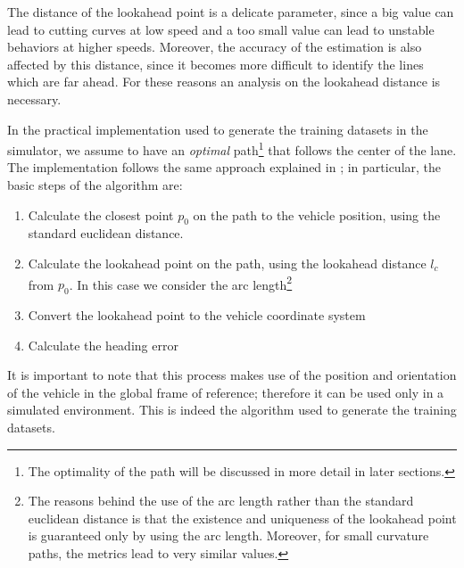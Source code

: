\documentclass[a4paper,12pt,sort&compress]{article}
\begin{document}
    The distance of the lookahead point
    is a delicate parameter, since a big value can lead to cutting curves at low
    speed and a too small value can lead to unstable behaviors at higher speeds.
    Moreover, the accuracy of the estimation is also affected by this distance,
    since it becomes more difficult to identify the lines which are far ahead.
    For these reasons an analysis on the lookahead distance is necessary. 

    In the practical implementation used to generate the training datasets in
    the simulator, we assume to have an \textit{optimal} path\footnote{The optimality of the path will be discussed in
    more detail in later sections.} that follows the center of the lane. The
    implementation follows the same approach explained in
    \citep*{coulter1992implementation}; in particular, the basic steps of the
    algorithm are:
    \begin{enumerate}
        \item Calculate the closest point $p_0$ on the path to the vehicle position,
        using the standard euclidean distance.
        \item Calculate the lookahead point on the path, using the lookahead
        distance $l_c$ from $p_0$. In this case we consider the arc
        length\footnote{The reasons behind the use of the arc length rather than
        the standard euclidean distance is that the existence and uniqueness of
        the lookahead point is guaranteed only by using the arc length.
        Moreover, for small curvature paths, the metrics lead to very similar values.}
        \item Convert the lookahead point to the vehicle coordinate system
        \item Calculate the heading error
    \end{enumerate}
    It is important to note that this process makes use of the position and
    orientation of the vehicle in the global frame of reference; therefore it
    can be used only in a simulated environment. This is indeed the algorithm
    used to generate the training datasets. 
\end{document}
